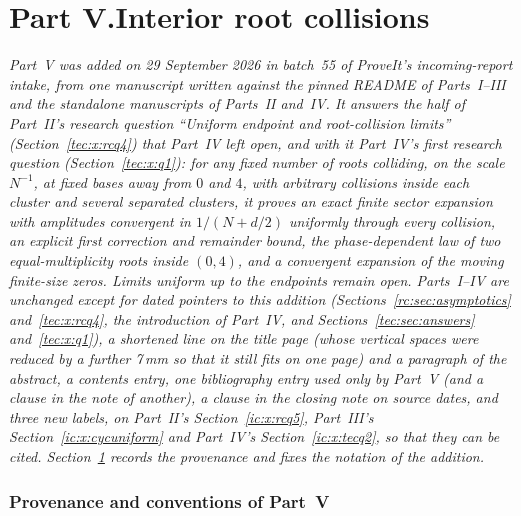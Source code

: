 \documentclass[11pt,a4paper]{article}
\numberwithin{equation}{section}
\theoremstyle{definition}
\theoremstyle{remark}
\begin{document}
\clearpage
{}\part*{Part V.\quad Interior root collisions}
\setlength{\emergencystretch}{3em}%

\noindent\emph{Part~V was added on 29 September 2026 in batch~55 of
ProveIt's incoming-report intake, from one manuscript written against the
pinned README of Parts~I--III and the standalone manuscripts of Parts~II
and~IV.  It answers the half of Part~II's research question ``Uniform
endpoint and root-collision limits'' (Section~\ref{tec:x:rcq4}) that
Part~IV left open, and with it Part~IV's first research question
(Section~\ref{tec:x:q1}): for any fixed number of roots colliding, on the
scale $N^{-1}$, at fixed bases away from $0$ and $4$, with arbitrary
collisions inside each cluster and several separated clusters, it proves an
exact finite sector expansion with amplitudes convergent in $1/(N+d/2)$
uniformly through every collision, an explicit first correction and
remainder bound, the phase-dependent law of two equal-multiplicity roots
inside $(0,4)$, and a convergent expansion of the moving finite-size zeros.
Limits uniform up to the endpoints remain open.  Parts~I--IV are unchanged
except for dated pointers to this addition (Sections~\ref{rc:sec:asymptotics}
and~\ref{tec:x:rcq4}, the introduction of Part~IV, and
Sections~\ref{tec:sec:answers} and~\ref{tec:x:q1}), a shortened line on the
title page (whose vertical spaces were reduced by a further 7\,mm so that it
still fits on one page) and a paragraph of the abstract, a contents entry, one bibliography entry
used only by Part~V (and a clause in the note of another), a clause in the
closing note on source dates, and three new labels, on Part~II's
Section~\ref{ic:x:rcq5}, Part~III's Section~\ref{ic:x:cycuniform} and
Part~IV's Section~\ref{ic:x:tecq2}, so that they can be cited.
Section~\ref{ic:sec:intro} records the provenance and fixes the notation of
the addition.}

\section{Provenance and conventions of Part~V}\label{ic:sec:intro}
\end{document}
